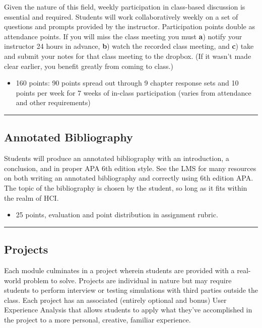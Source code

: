 \documentclass[]{article}
\providecommand{\tightlist}{%
  \setlength{\itemsep}{0pt}\setlength{\parskip}{0pt}}
\begin{document}
Given the nature of this field, weekly participation in class-based
discussion is essential and required. Students will work collaboratively
weekly on a set of questions and prompts provided by the instructor.
Participation points double as attendance points. If you will miss the
class meeting you must \textbf{a}) notify your instructor 24 hours in
advance, \textbf{b}) watch the recorded class meeting, and \textbf{c})
take and submit your notes for that class meeting to the dropbox. (If it
wasn't made clear earlier, you benefit greatly from coming to class.)

\begin{itemize}
\tightlist
\item
  160 points: 90 points spread out through 9 chapter response sets and
  10 points per week for 7 weeks of in-class participation (varies from
  attendance and other requirements)
\end{itemize}

\begin{center}\rule{0.5\linewidth}{\linethickness}\end{center}

\hypertarget{annotated-bibliography}{%
\subsection{Annotated Bibliography}\label{annotated-bibliography}}

Students will produce an annotated bibliography with an introduction, a
conclusion, and in proper APA 6th edition style. See the LMS for many
resources on both writing an annotated bibliography and correctly using
6th edition APA. The topic of the bibliography is chosen by the student,
so long as it fits within the realm of HCI.

\begin{itemize}
\tightlist
\item
  25 points, evaluation and point distribution in assignment rubric.
\end{itemize}

\begin{center}\rule{0.5\linewidth}{\linethickness}\end{center}

\hypertarget{projects}{%
\subsection{Projects}\label{projects}}

Each module culminates in a project wherein students are provided with a
real-world problem to solve. Projects are individual in nature but may
require students to perform interview or testing simulations with third
parties outside the class. Each project has an associated (entirely
optional and bonus) User Experience Analysis that allows students to
apply what they've accomplished in the project to a more personal,
creative, familiar experience.
\end{document}

